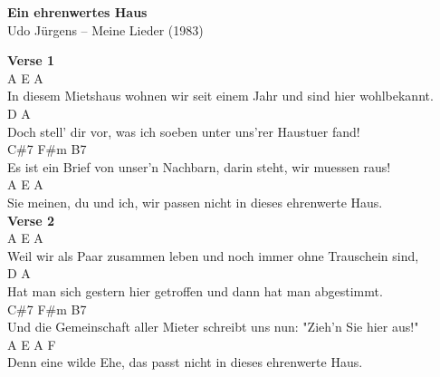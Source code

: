 \documentclass[a4paper]{article}
\begin{document}
    \begin{center}
        \textbf{Ein ehrenwertes Haus}
        ~\\
        Udo Jürgens -- Meine Lieder (1983)
    \end{center}
    {
        \scriptsize
        \textbf{Verse 1}
        ~\\
        {
            \cutive
            \obeyspaces
           A                               E                        A
\\
In diesem Mietshaus wohnen wir seit einem Jahr und sind hier wohlbekannt.
\\
                 D                                         A
\\
Doch stell' dir vor, was ich soeben unter uns'rer Haustuer fand!
\\
                                               C\#7              F\#m      B7
\\
Es ist ein Brief von unser'n Nachbarn, darin steht, wir muessen raus!
\\
             A                      E                          A
\\
Sie meinen, du und ich, wir passen nicht in dieses ehrenwerte Haus.
\\

        }
        \textbf{Verse 2}
        ~\\
        {
            \cutive
            \obeyspaces
              A                           E                      A
\\
Weil wir als Paar zusammen leben und noch immer ohne Trauschein sind,
\\
              D                                            A
\\
Hat man sich gestern hier getroffen und dann hat man abgestimmt.
\\
                                                C\#7                  F\#m       B7
\\
Und die Gemeinschaft aller Mieter schreibt uns nun: "Zieh'n Sie hier aus!"
\\
           A                    E                          A      F
\\
Denn eine wilde Ehe, das passt nicht in dieses ehrenwerte Haus.
\\

}}
\end{document}
